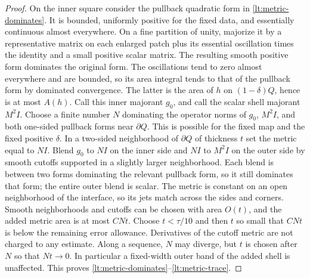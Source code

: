\begin{proof}
On the inner square consider the pullback quadratic form in
\eqref{lt:metric-dominates}.  It is bounded, uniformly positive for the
fixed data, and essentially continuous almost everywhere.  On a fine
partition of unity, majorize it by a representative matrix on each
enlarged patch plus its essential oscillation times the identity and a
small positive scalar matrix.  The resulting smooth positive form
dominates the original form.  The oscillations tend to zero almost
everywhere and are bounded, so its area integral tends to that of the
pullback form by dominated convergence.  The latter is the area of
$h$ on $(1-\delta)Q$, hence is at most $A(h)$.  Call this inner majorant $g_0$, and call the scalar shell
majorant $M^2I$.  Choose a finite number $N$ dominating the operator
norms of $g_0$, $M^2I$, and both one-sided pullback forms near
$\partial Q$.  This is possible for the fixed map and the fixed
positive $\delta$.  In a two-sided neighborhood of $\partial Q$ of
thickness $t$ set the metric equal to $NI$.  Blend $g_0$ to $NI$
on the inner side and $NI$ to $M^2I$ on the outer side by smooth
cutoffs supported in a slightly larger neighborhood.  Each blend is
between two forms dominating the relevant pullback form, so it still
dominates that form; the entire outer blend is scalar.  The metric
is constant on an open neighborhood of the interface, so its jets
match across the sides and corners.  Smooth neighborhoods and cutoffs
can be chosen with area $O(t)$, and the added metric area is at most
$CNt$.  Choose $t<\tau/10$ and then $t$ so small that $CNt$ is below
the remaining error allowance.  Derivatives of the cutoff metric
are not charged to any estimate.  Along a sequence, $N$ may diverge,
but $t$ is chosen after $N$ so that $Nt\to0$.  In particular a
fixed-width outer band of the added shell is unaffected.  This proves \eqref{lt:metric-dominates}--\eqref{lt:metric-trace}.


\end{proof}
